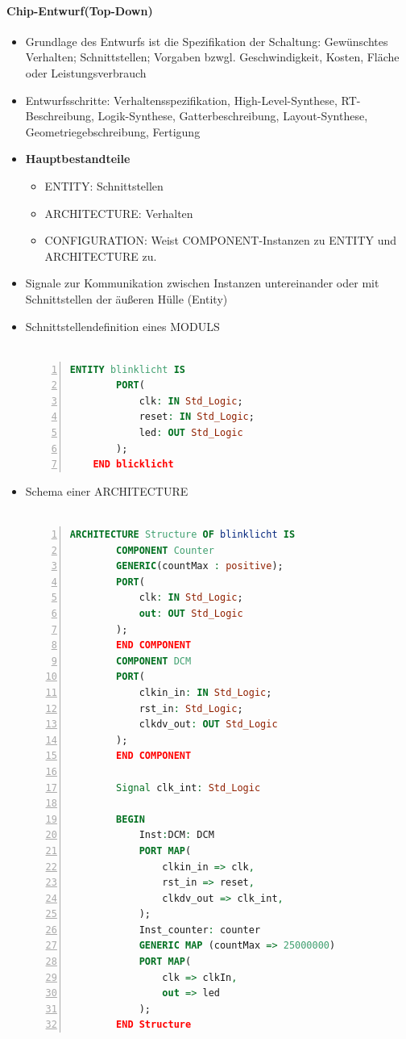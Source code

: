 	\paragraph{Chip-Entwurf(Top-Down)}
		\begin{itemize}
			\item Grundlage des Entwurfs ist die Spezifikation der Schaltung: Gewünschtes Verhalten; Schnittstellen; Vorgaben bzwgl. Geschwindigkeit, Kosten, Fläche oder Leistungsverbrauch
			\item Entwurfsschritte: Verhaltensspezifikation, High-Level-Synthese, RT-Beschreibung, Logik-Synthese, Gatterbeschreibung, Layout-Synthese, Geometriegebschreibung, Fertigung
			\item \textbf{Hauptbestandteile} 
			\begin{itemize}
				\item ENTITY: Schnittstellen
				\item ARCHITECTURE: Verhalten
				\item CONFIGURATION: Weist COMPONENT-Instanzen zu ENTITY und ARCHITECTURE zu.
			\end{itemize} 
			\item Signale zur Kommunikation zwischen Instanzen untereinander oder mit Schnittstellen der äußeren Hülle (Entity)
			\item Schnittstellendefinition eines MODULS\\\\
			\begin{minipage}{\linewidth}
				\begin{lstlisting}[frame=single,numbers=left,mathescape,language=VHDL,tabsize=4]
	ENTITY blinklicht IS
		PORT(
			clk: IN Std_Logic;
			reset: IN Std_Logic;
			led: OUT Std_Logic
		);
	END blicklicht
				\end{lstlisting}
			\end{minipage}
			\item Schema einer ARCHITECTURE\\\\
			\begin{minipage}{\linewidth}
				\begin{lstlisting}[frame=single,numbers=left,mathescape,language=VHDL,tabsize=4]
	ARCHITECTURE Structure OF blinklicht IS
		COMPONENT Counter
		GENERIC(countMax : positive);
		PORT(
			clk: IN Std_Logic;
			out: OUT Std_Logic
		);
		END COMPONENT
		COMPONENT DCM
		PORT(
			clkin_in: IN Std_Logic;
			rst_in: Std_Logic;
			clkdv_out: OUT Std_Logic
		);
		END COMPONENT

		Signal clk_int: Std_Logic

		BEGIN
			Inst:DCM: DCM
			PORT MAP(
				clkin_in => clk,
				rst_in => reset,
				clkdv_out => clk_int,
			);
			Inst_counter: counter
			GENERIC MAP (countMax => 25000000)
			PORT MAP(
				clk => clkIn,
				out => led
			);
		END Structure
				\end{lstlisting}
			\end{minipage}
		\end{itemize}


